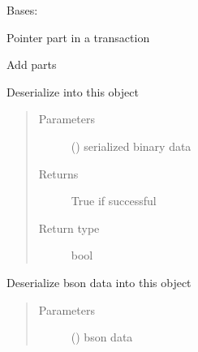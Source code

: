 \documentclass[letterpaper,10pt,english]{sphinxmanual}
\begin{document}
\begin{fulllineitems}
\label{\detokenize{bbc1.core.bbclib:bbc1.core.bbclib.BBcPointer}}
Bases: 

Pointer part in a transaction

\begin{fulllineitems}
\label{\detokenize{bbc1.core.bbclib:bbc1.core.bbclib.BBcPointer.add}}
Add parts

\end{fulllineitems}


\begin{fulllineitems}
\label{\detokenize{bbc1.core.bbclib:bbc1.core.bbclib.BBcPointer.deserialize}}
Deserialize into this object
\begin{quote}\begin{description}
\item[{Parameters}] \leavevmode
{} () \textendash{} serialized binary data

\item[{Returns}] \leavevmode
True if successful

\item[{Return type}] \leavevmode
bool

\end{description}\end{quote}

\end{fulllineitems}


\begin{fulllineitems}
\label{\detokenize{bbc1.core.bbclib:bbc1.core.bbclib.BBcPointer.deserialize_bson}}
Deserialize bson data into this object
\begin{quote}\begin{description}
\item[{Parameters}] \leavevmode
{} () \textendash{} bson data


\end{description}
\end{quote}
\end{fulllineitems}
\end{fulllineitems}
\end{document}
